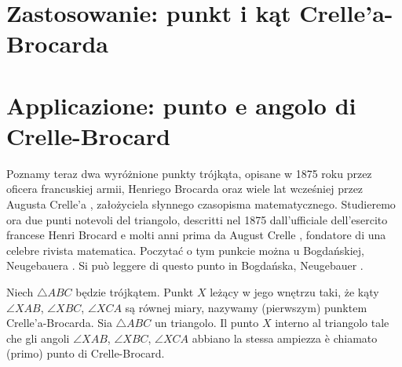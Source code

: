 
%

\section{Zastosowanie: punkt i kąt Crelle'a-Brocarda} %
\section{Applicazione: punto e angolo di Crelle-Brocard} %

Poznamy teraz dwa wyróżnione punkty trójkąta, opisane w 1875 roku przez oficera francuskiej armii, Henriego Brocarda oraz wiele lat wcześniej przez Augusta Crelle'a \cite{crelle_1816}, założyciela słynnego czasopisma matematycznego. %
Studieremo ora due punti notevoli del triangolo, descritti nel 1875 dall'ufficiale dell'esercito francese Henri Brocard e molti anni prima da August Crelle \cite{crelle_1816}, fondatore di una celebre rivista matematica. %
%
%
Poczytać o tym punkcie można u Bogdańskiej, Neugebauera \cite[s. 99]{neugebauer_2018}. %
Si può leggere di questo punto in Bogdańska, Neugebauer \cite[p. 99]{neugebauer_2018}. %

\begin{definition}
\label{punkty_brocarda}%
    Niech $\triangle ABC$ będzie trójkątem. %
    Punkt $X$ leżący w jego wnętrzu taki, że kąty $\angle XAB$, $\angle XBC$, $\angle XCA$ są równej miary, nazywamy (pierwszym) punktem Crelle'a-Brocarda. %
    Sia $\triangle ABC$ un triangolo. %
    Il punto $X$ interno al triangolo tale che gli angoli $\angle XAB$, $\angle XBC$, $\angle XCA$ abbiano la stessa ampiezza è chiamato (primo) punto di Crelle-Brocard. %
    \begin{center}

    \end{center}
\end{definition}

